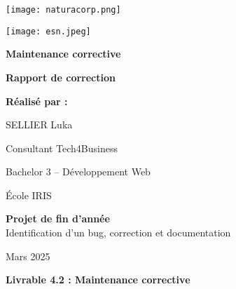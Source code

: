 \documentclass[a4paper,12pt]{report}
\begin{document}
\thispagestyle{empty}
\begin{center}
    \vspace*{0.5cm}
    \begin{minipage}{0.45\textwidth}
        \centering
        \texttt{[image: naturacorp.png]}
        \vspace{0.3cm}
    \end{minipage}
    \hfill
    \begin{minipage}{0.45\textwidth}
        \centering
        \texttt{[image: esn.jpeg]}
        \vspace{0.3cm}
    \end{minipage}
    \vspace{1.5cm}
    
    {\Huge\bfseries\color{naturacorpgreen}Maintenance corrective\par}
    \vspace{1.5cm}
    
    {\LARGE\bfseries Rapport de correction \par}
    \vspace{2cm}
    
    {\Large\bfseries Réalisé par :\par}
    \vspace{0.3cm}
    {\Large SELLIER Luka\par}
    \vspace{0.5cm}
    {\large Consultant Tech4Business\par}
    \vspace{0.3cm}
    {\large Bachelor 3 – Développement Web\par}
    \vspace{0.3cm}
    {\large École IRIS\par}
    \vspace{1.5cm}
    
    \begin{minipage}{0.8\textwidth}
        \centering
        \textbf{Projet de fin d'année}\\
        \vspace{0.2cm}
        Identification d'un bug, correction et documentation
    \end{minipage}
    \vspace{1.5cm}
    
    {\large Mars 2025\par}
\vspace*{\fill}
\begin{center}
    \textbf{Livrable 4.2 : Maintenance corrective}
\end{center}
\end{center}
\end{document}
